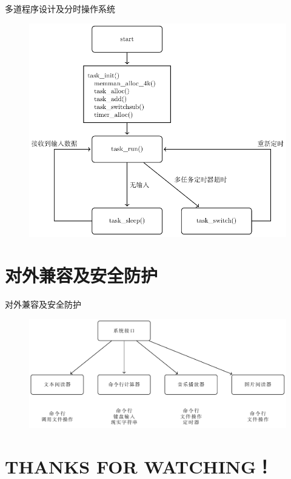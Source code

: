 \documentclass{beamer}
\begin{document}
    \begin{frame}{多道程序设计及分时操作系统}
      \begin{figure}[H]
        \centering
        \includegraphics[width=.8\textwidth]{../Thesis/fig/func/multi.pdf}
      \end{figure}
    \end{frame}
    
    \section{对外兼容及安全防护}
      \begin{frame}{对外兼容及安全防护}
        \begin{figure}[H]
          \centering
          \includegraphics[width=.8\textwidth]{fig/sc.pdf}
        \end{figure}
      \end{frame}

    \section{THANKS FOR WATCHING！}
    
    
\end{document}
